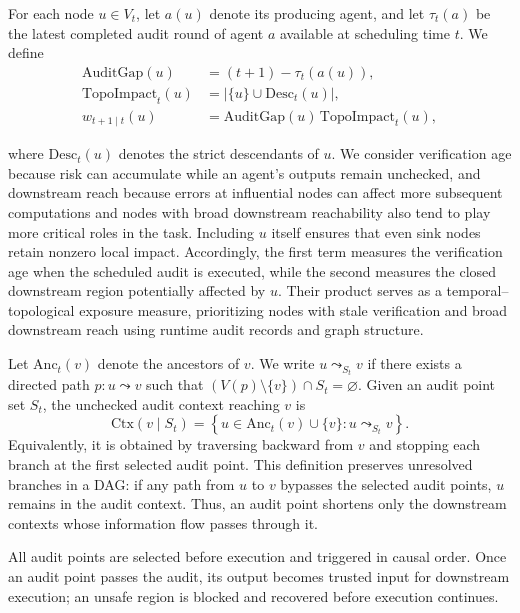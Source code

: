 \documentclass[letterpaper]{article} %
\begin{document}
For each node \(u\in V_t\), let \(a(u)\) denote its producing agent, and let \(\tau_t(a)\) be the latest completed audit round of agent \(a\) available at scheduling time \(t\). We define 
\begin{equation} \begin{aligned} \mathrm{Audit Gap}(u) &= (t+1)-\tau_t(a(u)),\\ \mathrm{TopoImpact}_t(u) &= \left|\{u\}\cup\mathrm{Desc}_t(u)\right|,\\ w_{t+1\mid t}(u) &= \mathrm{AuditGap}(u)\, \mathrm{TopoImpact}_t(u), 
\end{aligned} 
\end{equation} 

where \(\mathrm{Desc}_t(u)\) denotes the strict descendants of \(u\).
We consider verification age because risk can accumulate while an
agent's outputs remain unchecked, and downstream reach because errors
at influential nodes can affect more subsequent computations and nodes with broad downstream reachability also tend to play more critical roles in the task. Including
\(u\) itself ensures that even sink nodes retain nonzero local impact.
Accordingly, the first term measures the verification age when the
scheduled audit is executed, while the second measures the closed
downstream region potentially affected by \(u\). Their product serves
as a temporal--topological exposure measure, prioritizing nodes with
stale verification and broad downstream reach using runtime audit
records and graph structure.



Let \(\mathrm{Anc}_t(v)\) denote the ancestors of \(v\).
We write \(u\leadsto_{S_t}v\) if there exists a directed path
\(p:u\leadsto v\) such that
\((V(p)\setminus\{v\})\cap S_t=\varnothing\).
Given an audit point set \(S_t\), the unchecked audit context
reaching \(v\) is
\begin{equation}
\mathrm{Ctx}(v\mid S_t)
=
\left\{
u\in\mathrm{Anc}_t(v)\cup\{v\}
:
u\leadsto_{S_t}v
\right\}.
\end{equation}
Equivalently, it is obtained by traversing backward from \(v\)
and stopping each branch at the first selected audit point.
This definition preserves unresolved branches in a DAG: if
any path from \(u\) to \(v\) bypasses the selected audit points,
\(u\) remains in the audit context. Thus, an audit point shortens
only the downstream contexts whose information flow passes
through it.

All audit points are selected before execution and triggered
in causal order. Once an audit point passes the audit, its
output becomes trusted input for downstream execution; an
unsafe region is blocked and recovered before execution
continues.
\end{document}
